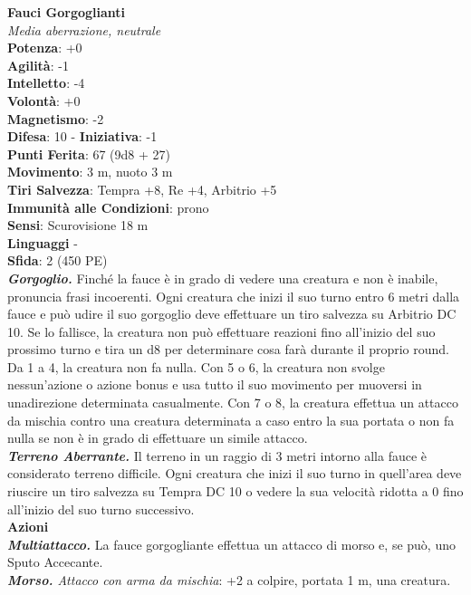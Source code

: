 \begin{multicols}{2}
\medskip\textbf{Fauci Gorgoglianti}\\
\emph{Media aberrazione, neutrale}\\
\textbf{Potenza}: +0\\
\textbf{Agilità}: -1\\
\textbf{Intelletto}: -4\\
\textbf{Volontà}: +0\\
\textbf{Magnetismo}: -2\\
\textbf{Difesa}: 10 - \textbf{Iniziativa}: -1\\
\textbf{Punti Ferita}: 67 (9d8 + 27)\\
\textbf{Movimento}: 3 m, nuoto 3 m\\
\textbf{Tiri Salvezza}: Tempra +8, Re +4, Arbitrio +5\\
\textbf{Immunità alle Condizioni}: prono\\
\textbf{Sensi}: Scurovisione 18 m\\
\textbf{Linguaggi} -\\
\textbf{Sfida}: 2 (450 PE)\smallskip\\
\emph{\textbf{Gorgoglio.}} Finché la fauce è in grado di vedere una creatura e non è inabile, pronuncia frasi incoerenti. Ogni creatura che inizi il suo turno entro 6 metri dalla fauce e può udire il suo gorgoglio deve effettuare un tiro salvezza su Arbitrio DC 10. Se lo fallisce, la creatura non può effettuare reazioni fino all'inizio del suo prossimo turno e tira un d8 per determinare cosa farà durante il proprio round. Da 1 a 4, la creatura non fa nulla. Con 5 o 6, la creatura non svolge nessun'azione o azione bonus e usa tutto il suo movimento per muoversi in unadirezione determinata casualmente. Con 7 o  8, la creatura effettua un attacco da mischia contro una creatura determinata a caso entro la sua portata o non fa nulla se non è in grado di effettuare un simile attacco.\\
\emph{\textbf{Terreno Aberrante.}} Il terreno in un raggio di 3 metri intorno alla fauce è considerato terreno difficile. Ogni creatura che inizi il suo turno in quell'area deve riuscire un tiro salvezza su Tempra DC 10 o vedere la sua velocità ridotta a 0 fino all'inizio del suo turno successivo.\\
\smallskip\textbf{Azioni}\\
\emph{\textbf{Multiattacco.}} La fauce gorgogliante effettua un attacco di morso e, se può, uno Sputo Accecante.\\
\emph{\textbf{Morso.} Attacco con arma da mischia}: +2 a colpire, portata 1 m, una creatura.\\

\end{multicols}
